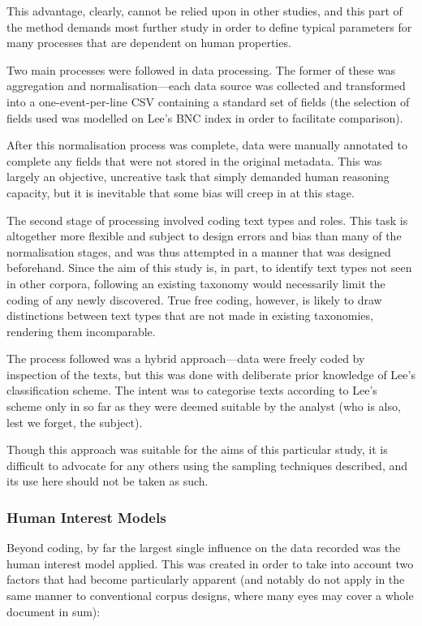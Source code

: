 This advantage, clearly, cannot be relied upon in other studies, and this part of the method demands most further study in order to define typical parameters for many processes that are dependent on human properties.

Two main processes were followed in data processing.  The former of these was aggregation and normalisation---each data source was collected and transformed into a one-event-per-line CSV containing a standard set of fields (the selection of fields used was modelled on Lee's BNC index in order to facilitate comparison).

After this normalisation process was complete, data were manually annotated to complete any fields that were not stored in the original metadata.  This was largely an objective, uncreative task that simply demanded human reasoning capacity, but it is inevitable that some bias will creep in at this stage.

The second stage of processing involved coding text types and roles.  This task is altogether more flexible and subject to design errors and bias than many of the normalisation stages, and was thus attempted in a manner that was designed beforehand.  Since the aim of this study is, in part, to identify text types not seen in other corpora, following an existing taxonomy would necessarily limit the coding of any newly discovered.  True free coding, however, is likely to draw distinctions between text types that are not made in existing taxonomies, rendering them incomparable.

The process followed was a hybrid approach---data were freely coded by inspection of the texts, but this was done with deliberate prior knowledge of Lee's classification scheme.  The intent was to categorise texts according to Lee's scheme only in so far as they were deemed suitable by the analyst (who is also, lest we forget, the subject).

Though this approach was suitable for the aims of this particular study, it is difficult to advocate for any others using the sampling techniques described, and its use here should not be taken as such.

\subsubsection{Human Interest Models}
Beyond coding, by far the largest single influence on the data recorded was the human interest model applied.  This was created in order to take into account two factors that had become particularly apparent (and notably do not apply in the same manner to conventional corpus designs, where many eyes may cover a whole document in sum):

